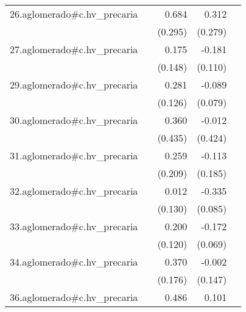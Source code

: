 {\begin{longtable}{l*{4}{D{.}{.}{-1}}}
\addlinespace
26.aglomerado#c.hv\_precaria&                     &       0.684\sym{*}  &       0.312         &                     \\
            &                     &     (0.295)         &     (0.279)         &                     \\
\addlinespace
27.aglomerado#c.hv\_precaria&                     &       0.175         &      -0.181         &                     \\
            &                     &     (0.148)         &     (0.110)         &                     \\
\addlinespace
29.aglomerado#c.hv\_precaria&                     &       0.281\sym{*}  &      -0.089         &                     \\
            &                     &     (0.126)         &     (0.079)         &                     \\
\addlinespace
30.aglomerado#c.hv\_precaria&                     &       0.360         &      -0.012         &                     \\
            &                     &     (0.435)         &     (0.424)         &                     \\
\addlinespace
31.aglomerado#c.hv\_precaria&                     &       0.259         &      -0.113         &                     \\
            &                     &     (0.209)         &     (0.185)         &                     \\
\addlinespace
32.aglomerado#c.hv\_precaria&                     &       0.012         &      -0.335\sym{***}&                     \\
            &                     &     (0.130)         &     (0.085)         &                     \\
\addlinespace
33.aglomerado#c.hv\_precaria&                     &       0.200         &      -0.172\sym{*}  &                     \\
            &                     &     (0.120)         &     (0.069)         &                     \\
\addlinespace
34.aglomerado#c.hv\_precaria&                     &       0.370\sym{*}  &      -0.002         &                     \\
            &                     &     (0.176)         &     (0.147)         &                     \\
\addlinespace
36.aglomerado#c.hv\_precaria&                     &       0.486         &       0.101         &                     \\

\end{longtable}}
